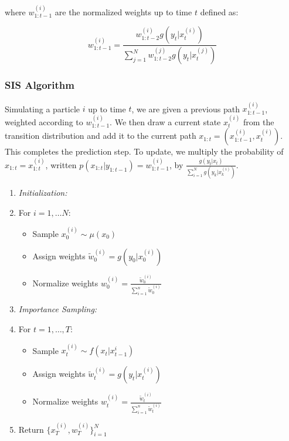\documentclass{article}
\begin{document}
\noindent
where $w_{1:t-1}^{(i)}$ are the normalized weights up to time $t$ defined as:

\begin{equation}
w_{1:t-1}^{(i)} = \frac{w_{1:t-2}^{(i)}g(y_{t}|x_{t}^{(i)})}{\sum_{j=1}^N w_{1:t-2}^{(j)}g(y_{t}|x_{t}^{(j)})}
\end{equation}


\subsubsection{SIS Algorithm}
Simulating a particle $i$ up to time $t$, we are given a previous path $x_{1:t-1}^{(i)}$, weighted according to $w_{1:t-1}^{(i)}$. We then draw a current state $x_{t}^{(i)}$ from the transition distribution and add it to the current path $x_{1:t} = (x_{1:t-1}^{(i)},x_t^{(i)})$. This completes the prediction step. To update, we multiply the probability of $x_{1:t} = x_{1:t}^{(i)}$, written $p(x_{1:t}|y_{1:t-1}) = w_{1:t-1}^{(i)}$, by $\frac{g(y_t|x_t)}{\sum_{i=1}^N g(y_k|x_k^{(i)})}$.

\begin{enumerate}
\item \textit{Initialization:}
\item[] For $i=1,\dots N$:
\begin{itemize}
\item[] Sample $x_0^{(i)} \sim \mu(x_0)$
\item[] Assign weights $\widetilde{w}_0^{(i)} = g(y_0|x_0^{(i)})$
\item[] Normalize weights $w_0^{(i)} = \frac{\widetilde{w}_0^{(i)}}{\sum_{i=1}^{n} \widetilde{w}_0^{(i)}}$
\end{itemize}
\item \textit{Importance Sampling:}
\item[] For $t=1,\dots,T$:
\begin{itemize}
\item[] Sample $x_t^{(i)} \sim f(x_t|x_{t-1}^{i})$
\item[] Assign weights $\widetilde{w}_t^{(i)} = g(y_t|x_t^{(i)})$
\item[] Normalize weights $w_t^{(i)} = \frac{\widetilde{w}_t^{(i)}}{\sum_{i=1}^{n} \widetilde{w}_t^{(i)}}$
\end{itemize}
\item Return $\{x_T^{(i)},w_T^{(i)}\}_{i=1}^N$
\end{enumerate}
\end{document}
